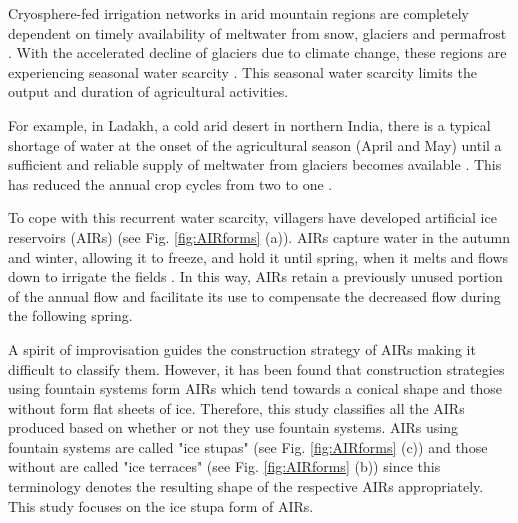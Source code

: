 \documentclass[tc, manuscript]{copernicus}
\begin{document}
\introduction

Cryosphere-fed irrigation networks in arid mountain regions are completely dependent on timely availability of
meltwater from snow, glaciers and permafrost \citep{immerzeelImportanceVulnerabilityWorld2020,
farhanHydrologicalRegimesConjunction2015, tveitenGlacierGrowingLocal2007}. With the accelerated decline of
glaciers due to climate change, these regions are experiencing seasonal water scarcity
\citep{hoelzleStatusRoleAlpine2019, xenariosAralSeaBasin2019, barandunStateFutureCryosphere2020}. This seasonal
water scarcity limits the output and duration of agricultural activities.

For example, in Ladakh, a cold arid desert in northern India, there is a typical shortage of water at the onset
of the agricultural season (April and May) until a sufficient and reliable supply of meltwater from glaciers
becomes available \citep{norphelSnowWaterHarvesting2015, nusserLocalKnowledgeGlobal2016,
vincentEnergyClimateChange2009}. This has reduced the annual crop cycles from two to one
\citep{nusserSociohydrologyArtificialGlaciers2019}.

To cope with this recurrent water scarcity, villagers have developed artificial ice reservoirs (AIRs) (see Fig.
\ref{fig:AIRforms} (a)). AIRs capture water in the autumn and winter, allowing it to freeze, and hold it until
spring, when it melts and flows down to irrigate the fields \citep{ipccChapterHighMountain2019,
vinceGlacierMan2009, clouseLadakhArtificialGlaciers2017, nusserSociohydrologyArtificialGlaciers2019}. In this
way, AIRs retain a previously unused portion of the annual flow and facilitate its use to compensate the
decreased flow during the following spring. 

A spirit of improvisation guides the construction strategy of AIRs making it difficult to classify them.
However, it has been found that construction strategies using fountain systems form AIRs which tend towards a
conical shape and those without form flat sheets of ice. Therefore, this study classifies all the AIRs produced
based on whether or not they use fountain systems. AIRs using fountain systems are called "ice stupas" (see Fig.
\ref{fig:AIRforms} (c)) and those without are called "ice terraces" (see Fig. \ref{fig:AIRforms} (b)) since this
terminology denotes the resulting shape of the respective AIRs appropriately. This study focuses on the ice
stupa form of AIRs.
\end{document}
